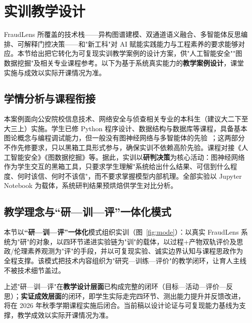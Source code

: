 \documentclass[12pt,a4paper]{ctexart}
\begin{document}
\section{实训教学设计}
\label{sec:teaching}

FraudLens 所覆盖的技术栈——异构图谱建模、双通道语义融合、多智能体反思编排、可解释门控决策——和"新工科"对 AI 赋能实践能力与工程素养的要求能够对应。本节给出把它转化为可复现实训教学案例的设计方案，供"人工智能安全""图数据挖掘"及相关专业课程参考。以下为基于系统真实能力的\textbf{教学案例设计}，课堂实施与成效以实际开课情况为准。

\subsection{学情分析与课程衔接}

本案例面向公安院校信息技术、网络安全与侦查相关专业的本科生（建议大二下至大三上）实施。学生已修 Python 程序设计、数据结构与数据库等课程，具备基本图论概念与编程调试能力，但一般没有图神经网络与多智能体的先验~\cite{edu_zhangjin2024}；这两部分不作先修要求，只以黑箱工具形式参与，确保实训不依赖高阶先验。课程对接《人工智能安全》《图数据挖掘》等。据此，实训以\textbf{研判决策}为核心活动：图神经网络作为学生交互的黑箱工具，只要求学生理解"系统给出什么结果、可信到什么程度、何时该信、何时不该信"，而不要求掌握模型内部机理。全部实验以 Jupyter Notebook 为载体，系统研判结果预烘焙供学生对比分析。

\subsection{教学理念与“研—训—评”一体化模式}

本节以\textbf{“研—训—评”一体化}模式组织实训（图~\ref{fig:mode}）：以真实 FraudLens 系统为"研"的对象，以四环节递进实验链为"训"的载体，以过程+产物双轨评价及思政/伦理素养观测为"评"的手段，并以可复现实验、诚实边界认知与课程思政作为全程支撑。该模式把技术内容组织为"研究—训练—评价"的教学闭环，让育人主线不被技术细节盖过。

上述"研—训—评"在\textbf{教学设计层面}已构成完整的闭环（目标—活动—评价—反思）；\textbf{实证成效层面}的闭环，即学生实际走完四环节、测出能力提升并反馈改进，将在 2026 年秋季学期课程实施后闭合。当前稿以设计论证与可复现能力基线为支撑，教学成效以实际开课情况为准。
\end{document}
